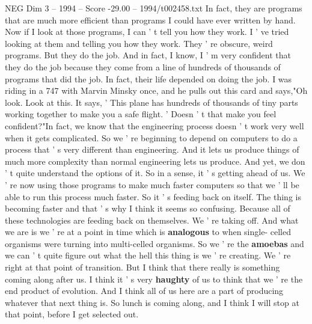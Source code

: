 \begin{textsample}{NEG Dim 3 – 1994 – Score -29.00 – 1994/t002458.txt}
In fact, they are programs that are much more efficient than programs I could have ever written by hand.
Now if I look at those programs, I can ' t tell you how they work.
I ' ve tried looking at them and telling you how they work.
They ' re obscure, weird programs.
But they do the job.
And in fact, I know, I ' m very confident that they do the job because they come from a line of hundreds of thousands of programs that did the job.
In fact, their life depended on doing the job.
I was riding in a 747 with Marvin Minsky once, and he pulls out this card and says,"Oh look.
Look at this.
It says, ' This plane has hundreds of thousands of tiny parts working together to make you a safe flight. ' Doesn ' t that make you feel confident?"In fact, we know that the engineering process doesn ' t work very well when it gets complicated.
So we ' re beginning to depend on computers to do a process that ' s very different than engineering.
And it lets us produce things of much more complexity than normal engineering lets us produce.
And yet, we don ' t quite understand the options of it.
So in a sense, it ' s getting ahead of us.
We ' re now using those programs to make much faster computers so that we ' ll be able to run this process much faster.
So it ' s feeding back on itself.
The thing is becoming faster and that ' s why I think it seems so confusing.
Because all of these technologies are feeding back on themselves.
We ' re taking off.
And what we are is we ' re at a point in time which is \textbf{analogous} to when single- celled organisms were turning into multi-celled organisms.
So we ' re the \textbf{amoebas} and we can ' t quite figure out what the hell this thing is we ' re creating.
We ' re right at that point of transition.
But I think that there really is something coming along after us.
I think it ' s very \textbf{haughty} of us to think that we ' re the end product of evolution.
And I think all of us here are a part of producing whatever that next thing is.
So lunch is coming along, and I think I will stop at that point, before I get selected out.

\end{textsample}
